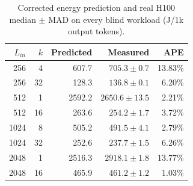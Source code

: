 \begin{table}[t]
\centering
\caption{Corrected energy prediction and real H100 median $\pm$ MAD on every
blind workload (J/1k output tokens).}
\label{tab:holdout-energy-points}
\scriptsize
\setlength{\tabcolsep}{3.1pt}
\begin{tabular}{@{}rrrrr@{}}
\toprule
$L_{in}$ & $k$ & Predicted & Measured & APE \\
\midrule
256  & 4  & 607.7  & $705.3\pm0.7$  & 13.83\% \\
256  & 32 & 128.3  & $136.8\pm0.1$  & 6.20\% \\
512  & 1  & 2592.2 & $2650.6\pm13.5$ & 2.21\% \\
512  & 16 & 263.6  & $254.2\pm1.7$  & 3.72\% \\
1024 & 8  & 505.2  & $491.5\pm4.1$  & 2.79\% \\
1024 & 32 & 252.6  & $237.7\pm1.5$  & 6.26\% \\
2048 & 1  & 2516.3 & $2918.1\pm1.8$ & 13.77\% \\
2048 & 16 & 465.9  & $461.2\pm1.2$  & 1.03\% \\
\bottomrule
\end{tabular}
\end{table}
